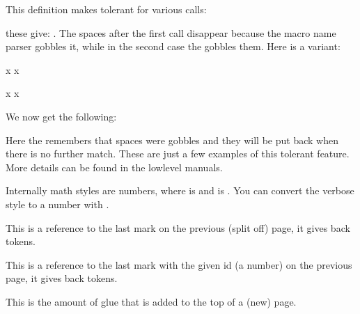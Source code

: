 \startbuffer
\tolerant{}
\stopbuffer

\typebuffer \getbuffer

This definition makes \type {\foo} tolerant for various calls:

\startbuffer
\foo \foo[1] \foo [1] \foo[1] [2] \foo [1] [2]
\stopbuffer

\typebuffer

these give: \inlinebuffer. The spaces after the first call disappear because the
macro name parser gobbles it, while in the second case the \type {#*} gobbles
them. Here is a variant:

\startbuffer
\tolerant{}

\foo[?] x
\foo[?] [?] x

\tolerant{}

\foo[?] x
\foo[?] [?] x
\stopbuffer

\typebuffer

We now get the following:

\getbuffer

Here the \type {#,} remembers that spaces were gobbles and they will be put back
when there is no further match. These are just a few examples of this tolerant
feature. More details can be found in the lowlevel manuals.

\stopnewprimitive

\startnewprimitive[title={\prm {tomathstyle}}]

Internally math styles are numbers, where  is \tomathstyle
\displaystyle \space and  is \tomathstyle
\crampedscriptscriptstyle. You can convert the verbose style to a number with
.

\stopnewprimitive

\startoldprimitive[title={\prm {topmark}}][obsolete=yes]

This is a reference to the last mark on the previous (split off) page, it gives
back tokens.

\stopoldprimitive

\startoldprimitive[title={\prm {topmarks}}]

This is a reference to the last mark with the given id (a number) on the previous
page, it gives back tokens.

\stopoldprimitive

\startoldprimitive[title={\prm {topskip}}]

This is the amount of glue that is added to the top of a (new) page.

